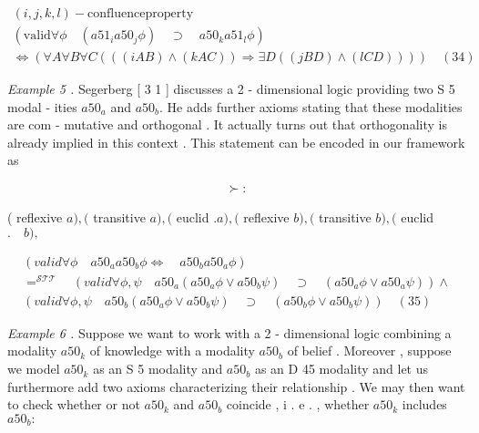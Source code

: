 \documentclass[10pt]{article}
\begin{document}
\begin{align*}
 (  i  ,   j  ,   k  ,   l  )  -  \mathrm{con fl uence}   \mathrm{property} \\ (  \mathrm{valid}   \forall  \phi  \quad  (  a51 _{ i }  a50 _{ j }  \phi  )  \quad  \supset  \quad  a50 _{ k }  a51 _{ l }  \phi  ) \\ \Leftrightarrow   (  \forall  A  \forall  B   \forall  C   (  (  (  i   A   B  )   \wedge   (  k   A   C  )  )   \Rightarrow   \exists  D   (  (  j   B   D  )   \wedge   (  l   CD  )  )  )  )  \quad  (  34  ) 
\end{align*}

\noindent \textit{Example 5 . } \quad Segerberg [ 3 1 ] discusses a 2 - dimensional logic providing two S 5 modal - 
 ities  $ a50 _{ a }$  and  $ a50 _{ b } . $  He adds further axioms stating that these modalities are com - 
 mutative and orthogonal . \quad It actually turns out that orthogonality is already 
 implied in this context . \quad This statement can be encoded in our framework as 

\begin{align*}
 \succ  : 
\end{align*}

\centerline{( reflexive  $ a  )  ,   ( $  transitive  $ a  )  ,   ( $  euclid  $ .   a  )  ,   ( $  reflexive  $ b  )  ,   ( $  transitive  $ b  )  ,   ( $  euclid  $ .  \quad  b  )  , $  }

\[\begin{aligned} (  valid   \forall  \phi  \quad  a50 _{ a }  a50 _{ b }  \phi   \Leftrightarrow  \quad  a50 _{ b }  a50 _{ a }  \phi  ) \\
  = ^{ \mathcal{STT} } \quad  (  valid   \forall  \phi  ,   \psi  \quad  a50 _{ a }  (  a50 _{ a }  \phi   \vee   a50 _{ b }  \psi  )  \quad  \supset  \quad  (  a50 _{ a }  \phi   \vee   a50 _{ a }  \psi  )  )   \wedge \\
  (  valid   \forall  \phi  ,   \psi  \quad  a50 _{ b }  (  a50 _{ a }  \phi   \vee   a50 _{ b }  \psi  )  \quad  \supset  \quad  (  a50 _{ b }  \phi   \vee   a50 _{ b }  \psi  )  )  \quad  (  35  ) \end{aligned}\]


\noindent \textit{Example 6 . } \quad Suppose we want to work with a 2 - dimensional logic combining a 
 modality  $ a50 _{ k }$  of knowledge with a modality  $ a50 _{ b }$  of belief . Moreover , suppose we 
 model  $ a50 _{ k }$  as an S 5 modality and  $ a50 _{ b }$  as an D 45 modality and let us furthermore 
 add two axioms characterizing their relationship . We may then want to check 
 whether or not  $ a50 _{ k }$  and  $ a50 _{ b }$  coincide , i . e . , whether  $ a50 _{ k }$  includes  $ a50 _{ b } : $  
\end{document}
